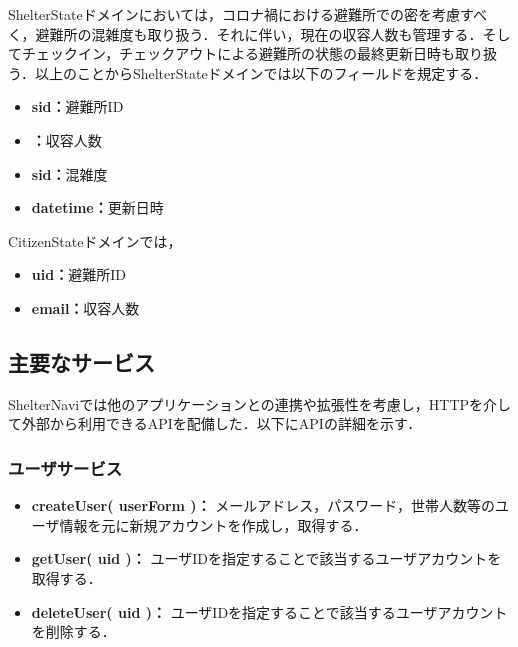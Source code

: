 \documentclass[technicalreport]{ieicej}
\begin{document}
ShelterStateドメインにおいては，コロナ禍における避難所での密を考慮すべく，避難所の混雑度も取り扱う．それに伴い，現在の収容人数も管理する．そしてチェックイン，チェックアウトによる避難所の状態の最終更新日時も取り扱う．以上のことからShelterStateドメインでは以下のフィールドを規定する．

\begin{itemize}
     \item{\textbf{sid：}}避難所ID
     \item{\textbf{：}}収容人数
     \item{\textbf{sid：}}混雑度
     \item{\textbf{datetime：}}更新日時
 \end{itemize}

CitizenStateドメインでは，

 \begin{itemize}
     \item{\textbf{uid：}}避難所ID
     \item{\textbf{email：}}収容人数
 \end{itemize}


\subsection{主要なサービス}
ShelterNaviでは他のアプリケーションとの連携や拡張性を考慮し，HTTPを介して外部から利用できるAPIを配備した．以下にAPIの詳細を示す．

\subsubsection{ユーザサービス}
\begin{itemize}
    \item{\textbf{createUser( userForm )：}
         メールアドレス，パスワード，世帯人数等のユーザ情報を元に新規アカウントを作成し，取得する．}
    \item{\textbf{getUser( uid )：}
         ユーザIDを指定することで該当するユーザアカウントを取得する．}
    \item{\textbf{deleteUser( uid )：}
         ユーザIDを指定することで該当するユーザアカウントを削除する．}
\end{itemize}
\end{document}
